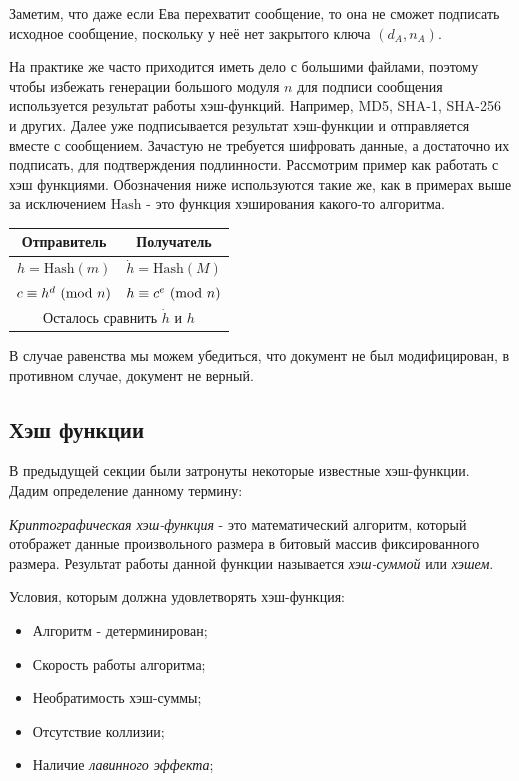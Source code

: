 Заметим, что даже если Ева перехватит сообщение, то она не сможет подписать исходное сообщение, поскольку у неё нет закрытого ключа $(d_A, n_A)$.

На практике же часто приходится иметь дело с большими файлами, поэтому чтобы избежать генерации большого модуля $n$ для подписи сообщения используется результат работы хэш-функций.
Например, MD5, SHA-1, SHA-256 и других. Далее уже подписывается результат хэш-функции и отправляется вместе с сообщением.
Зачастую не требуется шифровать данные, а достаточно их подписать, для подтверждения подлинности. Рассмотрим пример как работать с хэш функциями. Обозначения ниже используются такие же, как в примерах выше за исключением $\mathrm{Hash}$ - это функция хэширования какого-то алгоритма.
\begin{table}[h!]
\centering
\begin{tabular}{c | c}
Отправитель & Получатель \\
\hline
$h = \mathrm{Hash}(m)$ & $\dot{h} = \mathrm{Hash}(M)$\\
$c \equiv h^d \ (\mathrm{mod}\ n)$ & $h \equiv c^e \ (\mathrm{mod}\ n)$\\
\multicolumn{2}{c}{Осталось сравнить $\dot{h}$ и $h$}
\end{tabular}
\end{table}

В случае равенства мы можем убедиться, что документ не был модифицирован, в противном случае, документ не верный.
\newpage

\subsection{Хэш функции}

В предыдущей секции были затронуты некоторые известные хэш-функции. Дадим определение данному термину:

\emph{Криптографическая хэш-функция} - это математический алгоритм, который отображет данные произвольного размера в битовый массив фиксированного размера.
Результат работы данной функции называется \emph{хэш-суммой} или \emph{хэшем}.

Условия, которым должна удовлетворять хэш-функция:
\begin{itemize}
	\item Алгоритм - детерминирован;
	\item Скорость работы алгоритма;
	\item Необратимость хэш-суммы;
	\item Отсутствие коллизии;
	\item Наличие \emph{лавинного эффекта};
\end{itemize}

